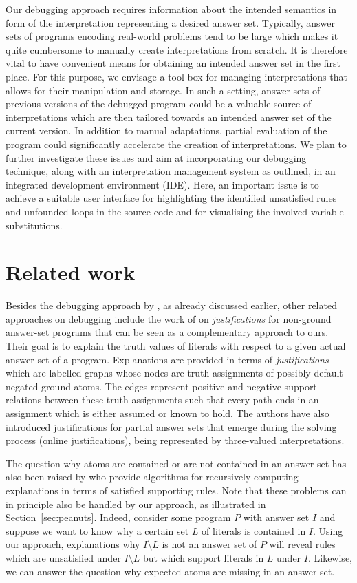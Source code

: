 \documentclass{tlp}
\begin{document}
Our debugging approach requires information about the intended semantics in form of
the interpretation representing a desired answer set.
Typically, answer sets of programs encoding real-world problems tend to  be large
which makes it quite cumbersome to manually create interpretations  from scratch.
It is therefore vital to have convenient means
for obtaining  an intended answer set in the first place.
For this purpose, we envisage a tool-box for managing  interpretations that allows
for their manipulation and storage. 
In such a setting, answer sets of previous versions of the debugged program could be a valuable source of  interpretations which are then tailored towards an intended answer set of the current version.
In addition to manual adaptations, partial evaluation of the program could significantly accelerate the creation of interpretations. 
We plan to further investigate these issues and
aim at incorporating our debugging technique, along with an interpretation management system as outlined, in an integrated development environment (IDE).
Here, an important issue is to achieve a suitable user interface for highlighting the identified unsatisfied rules and unfounded loops  in the source code and for visualising the involved variable substitutions.

\section{Related work}

Besides the debugging approach by , as already discussed earlier, other related approaches on debugging include the work of  \citeyear{pontelli09} on \emph{justifications} for non-ground answer-set programs that can be seen as a complementary approach to ours.
Their goal is to explain the truth values of literals with respect to a given actual answer set of a program.
Explanations are provided in terms of \emph{justifications} which are labelled graphs
whose nodes are truth assignments of possibly default-negated ground atoms.
The edges represent positive and negative support relations between these truth assignments such that every path ends in an assignment which is either assumed or known to hold.
The authors have also introduced justifications for partial answer sets that emerge during the solving process (online justifications), being represented by three-valued interpretations.

The question why atoms are contained or are not contained in an answer set has also been raised by  \citeyear{brain05} who provide algorithms for recursively computing explanations in terms of satisfied supporting rules.
Note that these problems can in principle also be handled by our approach, as illustrated in Section~\ref{sec:peanuts}.
Indeed, consider some program $P$ with answer set $I$ and suppose we want to know why a certain set $L$ of literals is contained in $I$.
Using our approach, explanations why $I\setminus L$ is not an answer set of $P$ will reveal rules which are unsatisfied under $I\setminus L$ but which support literals in $L$ under $I$.
Likewise, we can answer the question why expected atoms are missing in an answer set. 
\end{document}
